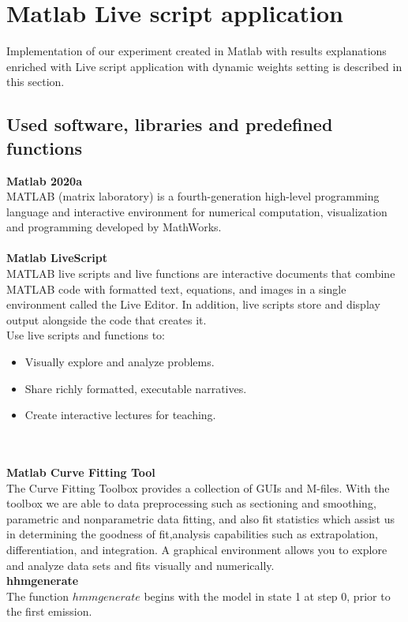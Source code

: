 \section{Matlab Live script application} \label{livescript}
Implementation of our experiment created in Matlab with results explanations enriched with Live script application with dynamic weights setting is described in this section.
\subsection{Used software, libraries and predefined functions} \label{subsec:libraries}
\textbf{Matlab 2020a}\\
MATLAB (matrix laboratory) is a fourth-generation high-level programming language and interactive environment for numerical
computation, visualization and programming developed by MathWorks.\\
\\
\textbf{Matlab LiveScript}~\cite{livescript}\\
MATLAB live scripts and live functions are interactive documents that combine MATLAB code with formatted text, equations,
and images in a single environment called the Live Editor.
In addition, live scripts store and display output alongside the code that creates it.\\
Use live scripts and functions to:\\
\begin{itemize}
    \item Visually explore and analyze problems.
    \item Share richly formatted, executable narratives.
    \item Create interactive lectures for teaching.
\end{itemize}\\
\\
\textbf{Matlab Curve Fitting Tool}\\
The Curve Fitting Toolbox provides a collection of GUIs and M-files.
With the toolbox we are able to data preprocessing such as sectioning and smoothing, parametric and nonparametric data fitting,
and also fit statistics which assist us in determining the goodness of fit,analysis capabilities such as extrapolation, differentiation, and integration.
A graphical environment allows you to explore and analyze data sets and fits visually and numerically.\\
\textbf{hhmgenerate~\cite{hhmgenerate}}\\
The function $hmmgenerate$ begins with the model in state 1 at step 0, prior to the first emission.
